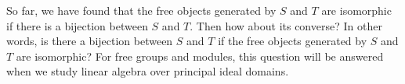 So far, we have found that the free objects generated by $S$ and $T$ are isomorphic if there is a bijection between $S$ and $T$.
Then how about its converse?
In other words, is there a bijection between $S$ and $T$ if the free objects generated by $S$ and $T$ are isomorphic?
For free groups and modules, this question will be answered when we study linear algebra over principal ideal domains.